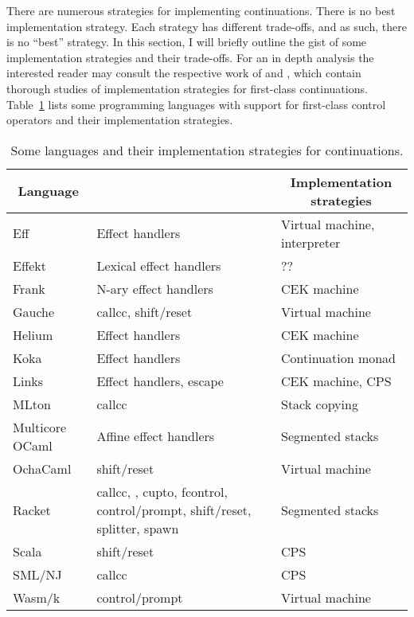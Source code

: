 \documentclass[12pt,phd,lfcs,twoside,openright,logo,leftchapter,normalheadings]{infthesis}
\theoremstyle{plain}
\theoremstyle{definition}
\begin{document}
There are numerous strategies for implementing continuations. There is
no best implementation strategy. Each strategy has different
trade-offs, and as such, there is no ``best'' strategy. In this
section, I will briefly outline the gist of some implementation
strategies and their trade-offs. For an in depth analysis the
interested reader may consult the respective work of
\citet{ClingerHO88} and \citet{FarvardinR20}, which contain thorough
studies of implementation strategies for first-class continuations.
%
Table~\ref{tbl:ctrl-operators-impls} lists some programming languages
with support for first-class control operators and their
implementation strategies.

\begin{table}
  \centering
  \begin{tabular}{| l | >{\raggedright}p{4.3cm} | l |}
    \hline
    \multicolumn{1}{|c|}{\textbf{Language}} & \multicolumn{1}{c |}{\textbf{Control operators}} & \multicolumn{1}{c|}{\textbf{Implementation strategies}}\\
    \hline
    Eff      & Effect handlers & Virtual machine, interpreter \\
    \hline
    Effekt   & Lexical effect handlers & ??\\
    \hline
    Frank    & N-ary effect handlers & CEK machine \\
    \hline
    Gauche   & callcc, shift/reset & Virtual machine \\
    \hline
    Helium   & Effect handlers & CEK machine \\
    \hline
    Koka     & Effect handlers & Continuation monad\\
    \hline
    Links    & Effect handlers, escape & CEK machine, CPS\\
    \hline
    MLton    & callcc & Stack copying\\
    \hline
    Multicore OCaml  & Affine effect handlers & Segmented stacks\\
    \hline
    OchaCaml & shift/reset & Virtual machine\\
    \hline
    Racket & callcc, \textCallcomc{}, cupto, fcontrol, control/prompt, shift/reset, splitter, spawn & Segmented stacks\\
    \hline
    Scala                 & shift/reset       & CPS\\
    \hline
    SML/NJ                & callcc            & CPS\\
    \hline
    Wasm/k                & control/prompt    & Virtual machine \\
    \hline
  \end{tabular}
  \caption{Some languages and their implementation strategies for continuations.}\label{tbl:ctrl-operators-impls}
\end{table}
\end{document}
